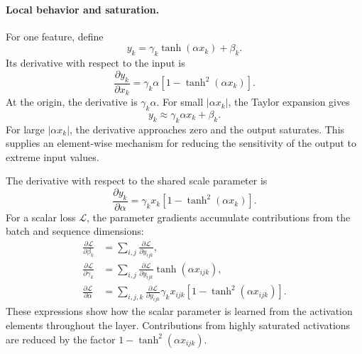 \paragraph{Local behavior and saturation.}
For one feature, define
\begin{equation}
    y_k
    =
    \gamma_k\tanh(\alpha x_k)+\beta_k.
    \label{eq:norm-dyt-scalar}
\end{equation}
Its derivative with respect to the input is
\begin{equation}
    \boxed{
    \frac{\partial y_k}{\partial x_k}
    =
    \gamma_k\alpha
    \left[1-\tanh^2(\alpha x_k)\right].
    }
    \label{eq:norm-dyt-input-derivative}
\end{equation}
At the origin, the derivative is \(\gamma_k\alpha\). For small
\(|\alpha x_k|\), the Taylor expansion gives
\begin{equation}
    y_k
    \approx
    \gamma_k\alpha x_k+\beta_k.
    \label{eq:norm-dyt-local-linear}
\end{equation}
For large \(|\alpha x_k|\), the derivative approaches zero and the output
saturates. This supplies an element-wise mechanism for reducing the
sensitivity of the output to extreme input values.

The derivative with respect to the shared scale parameter is
\begin{equation}
    \frac{\partial y_k}{\partial\alpha}
    =
    \gamma_k x_k
    \left[1-\tanh^2(\alpha x_k)\right].
    \label{eq:norm-dyt-alpha-derivative}
\end{equation}
For a scalar loss \(\mathcal{L}\), the parameter gradients accumulate
contributions from the batch and sequence dimensions:
\begin{align}
    \frac{\partial\mathcal{L}}{\partial\beta_k}
    &=
    \sum_{i,j}
    \frac{\partial\mathcal{L}}{\partial y_{ijk}},
    \label{eq:norm-dyt-beta-gradient}
    \\
    \frac{\partial\mathcal{L}}{\partial\gamma_k}
    &=
    \sum_{i,j}
    \frac{\partial\mathcal{L}}{\partial y_{ijk}}
    \tanh(\alpha x_{ijk}),
    \label{eq:norm-dyt-gamma-gradient}
    \\
    \frac{\partial\mathcal{L}}{\partial\alpha}
    &=
    \sum_{i,j,k}
    \frac{\partial\mathcal{L}}{\partial y_{ijk}}
    \gamma_k x_{ijk}
    \left[1-\tanh^2(\alpha x_{ijk})\right].
    \label{eq:norm-dyt-alpha-gradient}
\end{align}
These expressions show how the scalar parameter is learned from the
activation elements throughout the layer. Contributions from highly
saturated activations are reduced by the factor
\(1-\tanh^2(\alpha x_{ijk})\).

